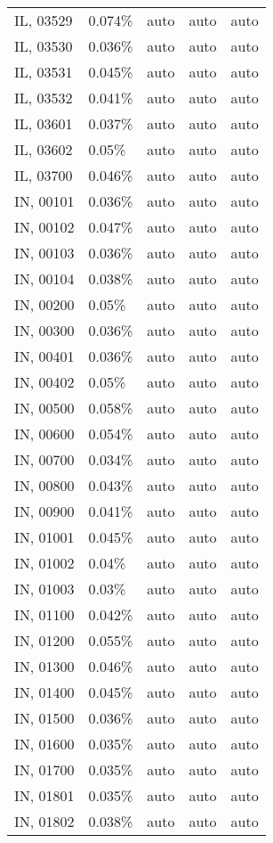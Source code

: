 \begin{longtable}[]{@{}lllll@{}}
IL, 03529 & 0.074\% & auto & auto & auto \\
IL, 03530 & 0.036\% & auto & auto & auto \\
IL, 03531 & 0.045\% & auto & auto & auto \\
IL, 03532 & 0.041\% & auto & auto & auto \\
IL, 03601 & 0.037\% & auto & auto & auto \\
IL, 03602 & 0.05\% & auto & auto & auto \\
IL, 03700 & 0.046\% & auto & auto & auto \\
IN, 00101 & 0.036\% & auto & auto & auto \\
IN, 00102 & 0.047\% & auto & auto & auto \\
IN, 00103 & 0.036\% & auto & auto & auto \\
IN, 00104 & 0.038\% & auto & auto & auto \\
IN, 00200 & 0.05\% & auto & auto & auto \\
IN, 00300 & 0.036\% & auto & auto & auto \\
IN, 00401 & 0.036\% & auto & auto & auto \\
IN, 00402 & 0.05\% & auto & auto & auto \\
IN, 00500 & 0.058\% & auto & auto & auto \\
IN, 00600 & 0.054\% & auto & auto & auto \\
IN, 00700 & 0.034\% & auto & auto & auto \\
IN, 00800 & 0.043\% & auto & auto & auto \\
IN, 00900 & 0.041\% & auto & auto & auto \\
IN, 01001 & 0.045\% & auto & auto & auto \\
IN, 01002 & 0.04\% & auto & auto & auto \\
IN, 01003 & 0.03\% & auto & auto & auto \\
IN, 01100 & 0.042\% & auto & auto & auto \\
IN, 01200 & 0.055\% & auto & auto & auto \\
IN, 01300 & 0.046\% & auto & auto & auto \\
IN, 01400 & 0.045\% & auto & auto & auto \\
IN, 01500 & 0.036\% & auto & auto & auto \\
IN, 01600 & 0.035\% & auto & auto & auto \\
IN, 01700 & 0.035\% & auto & auto & auto \\
IN, 01801 & 0.035\% & auto & auto & auto \\
IN, 01802 & 0.038\% & auto & auto & auto \\

\end{longtable}
